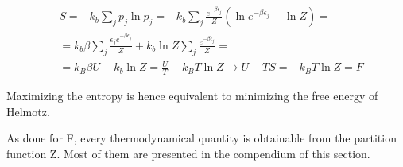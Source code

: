 \documentclass{article}
\begin{document}
\begin{equation}
    \begin{aligned}
         & S=-k_b\sum_{j}p_j\ln{p_j}=-k_b\sum_{j}\frac{e^{-\beta \epsilon_j}}{Z}(\ln{e^{-\beta \epsilon_j}}-\ln{Z})=     \\
         & =k_b\beta\sum_{j}\frac{\epsilon_j e^{-\beta \epsilon_j}}{Z}+k_b\ln{Z}\sum_{j}\frac{e^{-\beta \epsilon_j}}{Z}= \\
         & =k_B\beta U+k_b\ln{Z}=\frac{U}{T}-k_BT\ln{Z} \rightarrow U-TS=-k_BT\ln{Z}=F
    \end{aligned}
\end{equation}

Maximizing the entropy is hence equivalent to minimizing the free energy of Helmotz.

As done for F, every thermodynamical quantity is obtainable from the partition function Z.
Most of them are presented in the compendium of this section.

\newpage
\end{document}
